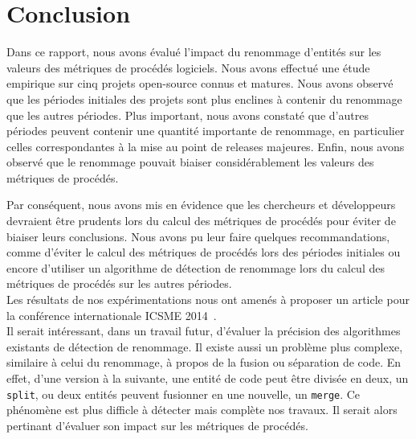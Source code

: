 \section{Conclusion}
\label{sec:conclusion}

Dans ce rapport, nous avons évalué l'impact du renommage d'entités sur les valeurs des métriques de procédés logiciels. Nous avons effectué une étude empirique sur cinq projets open-source connus et matures. Nous avons observé que les périodes initiales des projets sont plus enclines à contenir du renommage que les autres périodes. Plus important, nous avons constaté que d'autres périodes peuvent contenir une quantité importante de renommage, en particulier celles correspondantes à la mise au point de releases majeures. Enfin, nous avons observé que le renommage pouvait biaiser considérablement les valeurs des métriques de procédés. 

Par conséquent, nous avons mis en évidence que les chercheurs et développeurs devraient être prudents lors du calcul des métriques de procédés pour éviter de biaiser leurs conclusions. Nous avons pu leur faire quelques recommandations, comme d’éviter le calcul des métriques de procédés lors des périodes initiales ou encore d’utiliser un algorithme de détection de renommage lors du calcul des métriques de procédés sur les autres périodes.\\

Les résultats de nos expérimentations nous ont amenés à proposer un article pour la conférence internationale ICSME 2014~\cite{icsme_2014}.\\

Il serait intéressant, dans un travail futur, d'évaluer la précision des algorithmes existants de détection de renommage. Il existe aussi un problème plus complexe, similaire à celui du renommage, à propos de la fusion ou séparation de code. En effet, d'une version à la suivante, une entité de code peut être divisée en deux, un \texttt{split}, ou deux entités peuvent fusionner en une nouvelle, un \texttt{merge}. Ce phénomène est plus difficle à détecter mais complète nos travaux. Il serait alors pertinant d'évaluer son impact sur les métriques de procédés. \\

